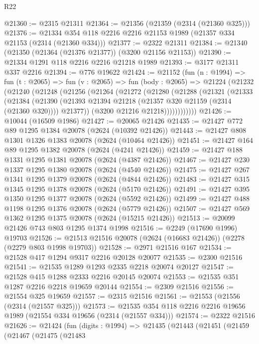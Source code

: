 \begin{lexlean}{R22}
\begin{coremodule}
@21360 := @2315 @21311
@21364 := @21356 (@21359 (@2314 (@21360 @325)))
@21376 := @21334 @354 @118 @2216 @2216 @21153 @1989 (@21357 @334 @21153 (@2314 (@21360 @334)))
@21377 := @2322 @21311
@21384 := @21340 (@21350 (@21364 (@21376 @21377)) (@3200 @21156 @21153))
@21390 := @21334 @1291 @118 @2216 @2216 @21218 @1989
@21393 := @3177 @21311 @337 @2216
@21394 := @776 @19622
@21424 := @21152
    (fun (n : @1994) =>
    fun (t : @2065) =>
    fun (v : @2065) =>
    fun (body : @2065) =>
    @21224
      (@21232
        (@21240
          (@21248
            (@21256
              (@21264
                (@21272
                  (@21280
                    (@21288
                      (@21321
                        (@21333
                          (@21384
                            (@21390
                              (@21393 @21394 @21218 (@21357 @320 @21159 (@2314 (@21360 @320))))
                              @21377))
                          (@3200 @21216 @21218))))))))))))
@21426 := @10044 (@16509 @1986)
@21427 := @20065 @21426
@21435 := @21427 @772 @89 @1295 @1384 @20078 (@2624 (@10392 @21426))
@21443 := @21427 @808 @1301 @1326 @1383 @20078 (@2624 (@10464 @21426))
@21451 := @21427 @164 @89 @1295 @1382 @20078 (@2624 (@4241 @21426))
@21459 := @21427 @188 @1331 @1295 @1381 @20078 (@2624 (@4387 @21426))
@21467 := @21427 @230 @1337 @1295 @1380 @20078 (@2624 (@4540 @21426))
@21475 := @21427 @267 @1341 @1295 @1379 @20078 (@2624 (@4844 @21426))
@21483 := @21427 @315 @1345 @1295 @1378 @20078 (@2624 (@5170 @21426))
@21491 := @21427 @395 @1350 @1295 @1377 @20078 (@2624 (@5592 @21426))
@21499 := @21427 @488 @1198 @1295 @1376 @20078 (@2624 (@5779 @21426))
@21507 := @21427 @569 @1362 @1295 @1375 @20078 (@2624 (@15215 @21426))
@21513 := @20099 @21426 @743 @803 @1295 @1374 @1998
@21516 := @2249 (@17690 @1996) @19703
@21526 := @21513 @21516 @20078 (@2624 (@16683 @21426)) (@2278 (@2279 @803 @1998 @19703))
@21528 := @2971 @21516 @167
@21534 := @21528 @417 @1294 @9317 @2216 @20128 @20077
@21535 := @2300 @21516
@21541 := @21535 @1289 @1293 @2335 @2218 @20074 @20127
@21547 := @21528 @415 @1288 @2333 @2216 @20145 @20074
@21553 := @21535 @351 @1287 @2216 @2218 @19659 @20144
@21554 := @2309 @21516
@21556 := @21554 @325 @19659
@21557 := @2315 @21516
@21561 := @21553 (@21556 (@2314 (@21557 @325)))
@21573 := @21535 @354 @118 @2216 @2216 @19656 @1989 (@21554 @334 @19656 (@2314 (@21557 @334)))
@21574 := @2322 @21516
@21626 := @21424
    (fun (digits : @1994) =>
    @21435
      (@21443
        (@21451
          (@21459
            (@21467
              (@21475
                (@21483

\end{coremodule}
\end{lexlean}
